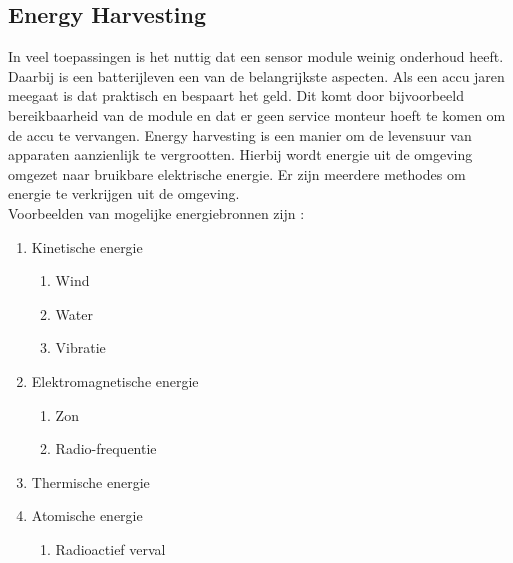 \subsection{Energy Harvesting}
In veel toepassingen is het nuttig dat een sensor module weinig onderhoud heeft. Daarbij is een batterijleven een van de belangrijkste aspecten. Als een accu jaren meegaat is dat praktisch en bespaart het geld. Dit komt door bijvoorbeeld bereikbaarheid van de module en dat er geen service monteur hoeft te komen om de accu te vervangen. Energy harvesting is een manier om de levensuur van apparaten aanzienlijk te vergrootten. Hierbij wordt energie uit de omgeving omgezet naar bruikbare elektrische energie. Er zijn meerdere methodes om energie te verkrijgen uit de omgeving. \\Voorbeelden van mogelijke energiebronnen zijn \cite{energyHarvesting}:
\begin{enumerate}
    \item Kinetische energie
    \begin{enumerate}
        \item Wind
        \item Water
        \item Vibratie
    \end{enumerate}
    \item Elektromagnetische energie
    \begin{enumerate}
        \item Zon
        \item Radio-frequentie
    \end{enumerate}
    \item Thermische energie
    \item Atomische energie
    \begin{enumerate}
        \item Radioactief verval
    \end{enumerate}
\end{enumerate} 
